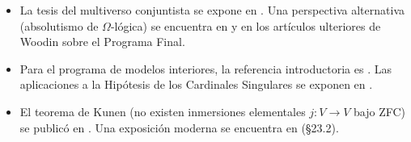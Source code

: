 \begin{itemize}[leftmargin=2em]
  \item La tesis del multiverso conjuntista se expone en \cite{hamkins2012}. Una perspectiva alternativa (absolutismo de $\Omega$-lógica) se encuentra en \cite{woodin2001} y en los artículos ulteriores de Woodin sobre el Programa Final.

  \item Para el programa de modelos interiores, la referencia introductoria es \cite{steel2010}. Las aplicaciones a la Hipótesis de los Cardinales Singulares se exponen en \cite{shelah1994}.

  \item El teorema de Kunen (no existen inmersiones elementales $j: V \to V$ bajo ZFC) se publicó en \cite{kunen1971}. Una exposición moderna se encuentra en \cite{kanamori2003} (§23.2).
\end{itemize}

